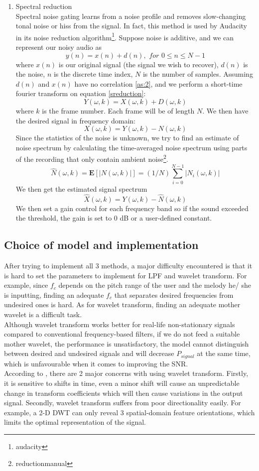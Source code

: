 \begin{enumerate}[label=\textbf{\arabic*})]
    \item Spectral reduction\\
    Spectral noise gating learns from a noise profile and removes slow-changing tonal noise or hiss from the signal. In 
    fact, this method is used by Audacity in its noise reduction algorithm\footnote{audacity}. 
    Suppose noise is additive, and we can represent our noisy audio as
    \[y(n) = x(n) + d(n), \textit{ for } 0 \leq n \leq N-1 \label{sreduction} \]
    where $x(n)$ is our original signal (the signal we wish to recover), $d(n)$ is the noise, $n$ is the discrete time index,
    $N$ is the number of samples. 
    Assuming $d(n)$ and $x(n)$ have no correlation \cref{as:2}, and we perform a short-time fourier transform on equation \cref{sreduction}:
    \[Y(\omega,k)= X(\omega,k) + D(\omega,k)\]
    where $k$ is the frame number. Each frame will be of
    length $N$. We then have the desired signal in frequency domain:
    \[X(\omega,k) = Y(\omega,k) - N(\omega,k)\]
    Since the statistics of the noise is unknown, we try to find an estimate of noise spectrum by calculating the time-averaged
    noise spectrum using parts of the recording that only contain ambient noise\footnote{reductionmanual}. 
    \[\hat{N}(\omega,k) = \textbf{E}[|N(\omega,k)|] = (1/N)\sum_{i=0}^{N-1}|N_i(\omega,k)|\]
    We then get the estimated signal spectrum
    \[\hat{X}(\omega,k) = Y(\omega,k) - \hat{N}(\omega,k)\]
    We then set a gain control for each frequency band so if the sound exceeded the threshold, the gain is set to 0 dB or a user-defined
    constant.
\end{enumerate}
\subsection{Choice of model and implementation}
After trying to implement all 3 methods, a major difficulty encountered is that it is hard to set the parameters to 
implement for LPF and wavelet transform.
For example, since $f_c$ depends on the pitch range of the user and the melody he/ she
is inputting, finding an adequate $f_c$ that separates desired frequencies from undesired ones is hard.
As for wavelet transform, finding an adequate mother wavelet is a difficult task.\\
Although wavelet transform works better for real-life non-stationary signals compared to conventional frequency-based filters, if we
do not feed a suitable mother wavelet, the performance is unsatisfactory, the model cannot distinguish between desired and undesired 
signals and will decrease $P_{signal}$ at the same time, which is unfavourable when it comes to improving the SNR.\\
According to \cite{complexwt}, there are 2 major concerns with using wavelet transform. 
Firstly, it is sensitive to shifts in time, even a minor shift will cause an unpredictable change in transform coefficients which will 
then cause variations in the output signal. Secondly, wavelet transform suffers from poor directionality easily. For example, 
a 2-D DWT can only reveal 3 spatial-domain feature orientations, which limits the optimal representation of the signal. 

